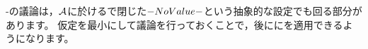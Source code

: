 \section{\WordAuslanderBuchweitzApproximationTheory}

\WordAuslander-\WordBuchweitz\cite{AuslanderBuchweitz1989}の議論は，\( \AbelianCategory \)に於ける\WordDirectSummand で閉じた\WordResolvingAdditivelyClosedSubcategory\( \Subclass \)という抽象的な設定でも回る部分があります。
仮定を最小にして議論を行っておくことで，後に\WordGorensteinHomologicalAlgebra に\WordAuslanderBuchweitzApproximationTheory を適用できるようになります。